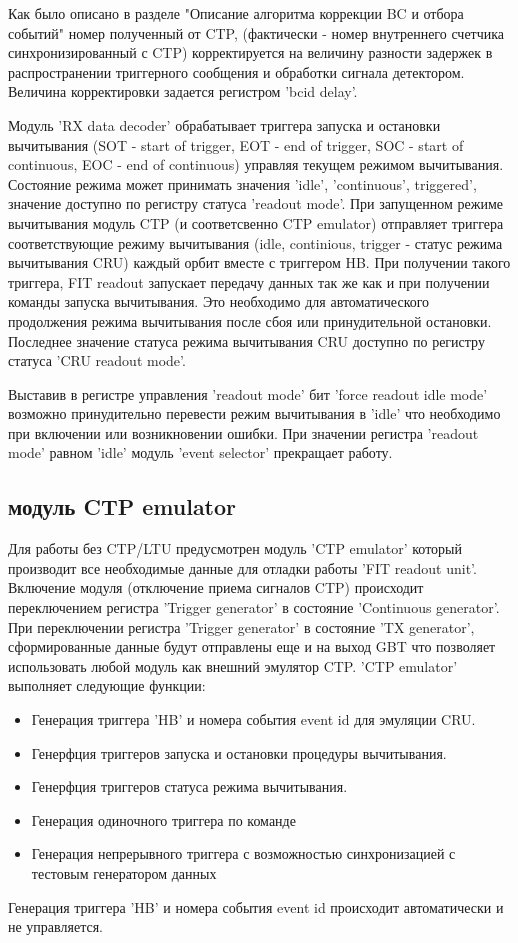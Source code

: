 \documentclass{article}
\begin{document}
Как было описано в разделе "Описание алгоритма коррекции BC и отбора событий" номер полученный от CTP, (фактически - номер внутреннего счетчика синхронизированный с CTP) корректируется на величину разности задержек в распространении триггерного сообщения и обработки сигнала детектором. Величина корректировки задается регистром 'bcid delay'.

Модуль 'RX data decoder' обрабатывает триггера запуска и остановки вычитывания (SOT - start of trigger, EOT - end of trigger, SOC - start of continuous, EOC - end of continuous) управляя текущем режимом вычитывания. Состояние режима может принимать значения 'idle', 'continuous', triggered', значение доступно по регистру статуса 'readout mode'. При запущенном режиме вычитывания модуль CTP (и соответсвенно CTP emulator) отправляет триггера соответствующие режиму вычитывания (idle, continious, trigger - статус режима вычитывания CRU) каждый орбит вместе с триггером HB. При получении такого триггера, FIT readout запускает передачу данных так же как и при получении команды запуска вычитывания. Это необходимо для автоматического продолжения режима вычитывания после сбоя или принудительной остановки.  Последнее значение статуса режима вычитывания CRU доступно по регистру статуса 'CRU readout mode'.

Выставив в регистре управления 'readout mode' бит 'force readout idle mode' возможно принудительно перевести режим вычитывания в 'idle' что необходимо при включении или возникновении ошибки. При значении регистра 'readout mode' равном 'idle' модуль 'event selector' прекращает работу.




\subsection{модуль CTP emulator}
Для работы без CTP/LTU предусмотрен модуль 'CTP emulator' который производит все необходимые данные для отладки работы 'FIT readout unit'. Включение модуля (отключение приема сигналов CTP) происходит переключением регистра 'Trigger generator' в состояние 'Continuous generator'. При переключении регистра 'Trigger generator' в состояние 'TX generator', сформированные данные будут отправлены еще и на выход GBT что позволяет использовать любой модуль как внешний эмулятор CTP. 'CTP emulator' выполняет следующие функции:
\begin{itemize}
\item Генерация триггера 'HB' и номера события event id для эмуляции CRU.
\item Генерфция триггеров запуска и остановки процедуры вычитывания.
\item Генерфция триггеров статуса режима вычитывания.
\item Генерация одиночного триггера по команде
\item Генерация непрерывного триггера с возможностью синхронизацией с тестовым генератором данных
\end{itemize}
Генерация триггера 'HB' и номера события event id происходит автоматически и не управляется.
\end{document}
